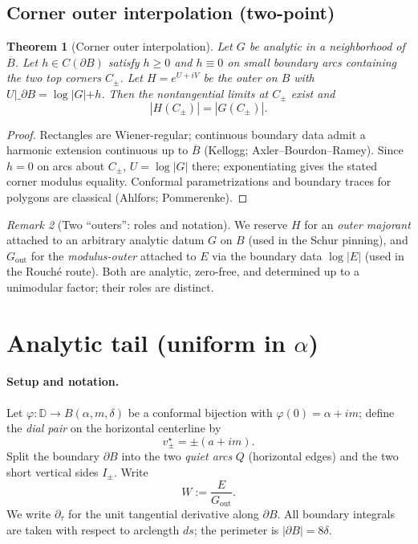 \documentclass[11pt]{article}
\numberwithin{equation}{section}
\newtheorem{theorem}{Theorem}[section]
\theoremstyle{remark}
\newtheorem{remark}[theorem]{Remark}
\newcommand{\D}{\mathbb{D}}
\newcommand{\Gout}{G_{\mathrm{out}}}
\begin{document}
\subsection{Corner outer interpolation (two-point)}\label{subsec:corner-interp}

\begin{theorem}[Corner outer interpolation]\label{thm:corner-outer}
Let $G$ be analytic in a neighborhood of $\overline B$. Let $h\in C(\partial B)$ satisfy $h\ge 0$ and $h\equiv 0$ on small boundary arcs containing the two top corners $C_\pm$. Let $H=e^{U+iV}$ be the outer on $B$ with $U|\_{\partial B}=\log|G|+h$. Then the nontangential limits at $C_\pm$ exist and
\[
|H(C_\pm)|=|G(C_\pm)|.
\]
\end{theorem}

\begin{proof}
Rectangles are Wiener-regular; continuous boundary data admit a harmonic extension continuous up to $\overline B$ (Kellogg; Axler--Bourdon--Ramey). Since $h=0$ on arcs about $C_\pm$, $U=\log|G|$ there; exponentiating gives the stated corner modulus equality. Conformal parametrizations and boundary traces for polygons are classical (Ahlfors; Pommerenke).
\end{proof}

\begin{remark}[Two “outers”: roles and notation]
We reserve $H$ for an \emph{outer majorant} attached to an arbitrary analytic datum $G$ on $B$ (used in the Schur pinning), and $\Gout$ for the \emph{modulus-outer} attached to $E$ via the boundary data $\log|E|$ (used in the Rouch\'e route). Both are analytic, zero-free, and determined up to a unimodular factor; their roles are distinct.
\end{remark}

\section{Analytic tail (uniform in \texorpdfstring{$\alpha$}{alpha})}\label{sec:tail}

\paragraph{Setup and notation.}
Let $\varphi:\D\to B(\alpha,m,\delta)$ be a conformal bijection with $\varphi(0)=\alpha+im$; define the \emph{dial pair} on the horizontal centerline by
\[
v_\pm^\star=\pm(a+im).
\]
Split the boundary $\partial B$ into the two \emph{quiet arcs} $Q$ (horizontal edges) and the two short vertical sides $I_\pm$.
Write
\[
W:=\frac{E}{\Gout}.
\]
We write $\partial_\tau$ for the unit tangential derivative along $\partial B$. All boundary integrals are taken with respect to arclength $ds$; the perimeter is $|\partial B|=8\delta$.
\end{document}
